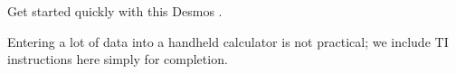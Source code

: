 \noindent Get started quickly with this Desmos .
\begin{center}
\end{center}


\noindent Entering a lot of data into a handheld calculator is not practical;  we include TI  instructions here simply for completion.

